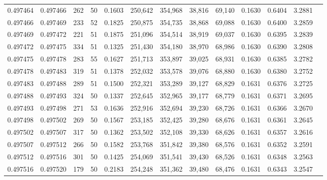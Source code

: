 \begin{tabular}{rrrrrrrrrrrrr}
0.497464 & 0.497466 & 262 &  50 &                                     0.1603 & 250,642 & 354,968 &  38,816 &  69,140 & 0.1630 & 0.6404 & 3.2881 \\
0.497466 & 0.497469 & 233 &  52 &                                     0.1825 & 250,875 & 354,735 &  38,868 &  69,088 & 0.1630 & 0.6400 & 3.2859 \\
0.497469 & 0.497472 & 221 &  51 &                                     0.1875 & 251,096 & 354,514 &  38,919 &  69,037 & 0.1630 & 0.6395 & 3.2839 \\
0.497472 & 0.497475 & 334 &  51 &                                     0.1325 & 251,430 & 354,180 &  38,970 &  68,986 & 0.1630 & 0.6390 & 3.2808 \\
0.497475 & 0.497478 & 283 &  55 &                                     0.1627 & 251,713 & 353,897 &  39,025 &  68,931 & 0.1630 & 0.6385 & 3.2782 \\
0.497478 & 0.497483 & 319 &  51 &                                     0.1378 & 252,032 & 353,578 &  39,076 &  68,880 & 0.1630 & 0.6380 & 3.2752 \\
0.497483 & 0.497488 & 289 &  51 &                                     0.1500 & 252,321 & 353,289 &  39,127 &  68,829 & 0.1631 & 0.6376 & 3.2725 \\
0.497488 & 0.497493 & 324 &  50 &                                     0.1337 & 252,645 & 352,965 &  39,177 &  68,779 & 0.1631 & 0.6371 & 3.2695 \\
0.497493 & 0.497498 & 271 &  53 &                                     0.1636 & 252,916 & 352,694 &  39,230 &  68,726 & 0.1631 & 0.6366 & 3.2670 \\
0.497498 & 0.497502 & 269 &  50 &                                     0.1567 & 253,185 & 352,425 &  39,280 &  68,676 & 0.1631 & 0.6361 & 3.2645 \\
0.497502 & 0.497507 & 317 &  50 &                                     0.1362 & 253,502 & 352,108 &  39,330 &  68,626 & 0.1631 & 0.6357 & 3.2616 \\
0.497507 & 0.497512 & 266 &  50 &                                     0.1582 & 253,768 & 351,842 &  39,380 &  68,576 & 0.1631 & 0.6352 & 3.2591 \\
0.497512 & 0.497516 & 301 &  50 &                                     0.1425 & 254,069 & 351,541 &  39,430 &  68,526 & 0.1631 & 0.6348 & 3.2563 \\
0.497516 & 0.497520 & 179 &  50 &                                     0.2183 & 254,248 & 351,362 &  39,480 &  68,476 & 0.1631 & 0.6343 & 3.2547 \\

\end{tabular}
